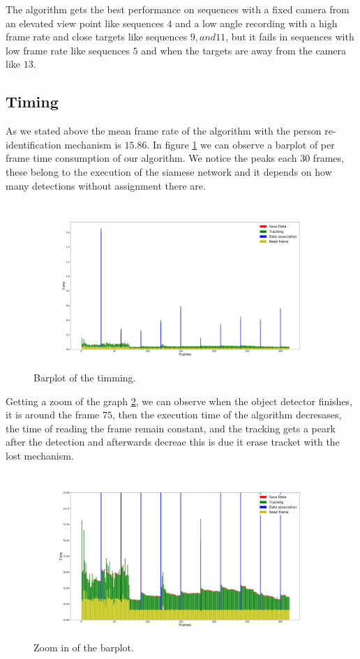 \documentclass[12pt, a4paper, titlepage,twoside,openright]{article}
\begin{document}
The algorithm gets the best performance on sequences with a fixed camera from an elevated view point like sequences $4$ and a low angle recording with a high frame rate and close targets like sequences $9,and 11$, but it fails in sequences with low frame rate like sequences $5$ and when the targets are away from the camera like $13$.


\subsection{Timing}


As we stated above the mean frame rate of the algorithm with the person re-identification mechanism is $15.86$. In figure \ref{timing1} we can observe a barplot of per frame time consumption of our algorithm.  We notice the peaks each $30$ frames, these belong to the execution of the siamese network and it depends on how many detections without assignment there are.

\begin{figure}[H]
\centering         
\includegraphics[width=0.9\linewidth]{graphicsRearrange/temps/timeGenral.png}
\caption{Barplot of the timming.} \label{timing1}
\end{figure}

Getting a zoom of the graph \ref{timing2}, we can observe when the object detector finishes, it is around the frame $75$, then the execution time of the algorithm decresases, the time of reading the frame remain constant, and the tracking gets a peark after the detection and afterwards decreae this is due it erase tracket with the lost mechanism. 

\begin{figure}[H]
\centering         
\includegraphics[width=0.9\linewidth]{graphicsRearrange/temps/timeSpecfici.png}
\caption{Zoom in of the barplot.} \label{timing2}
\end{figure}
\end{document}
